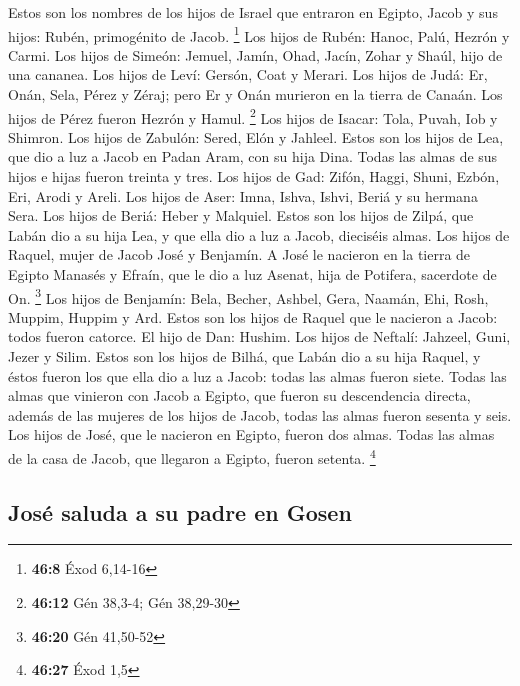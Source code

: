  Estos son los nombres de los hijos de Israel que entraron
en Egipto, Jacob y sus hijos: Rubén, primogénito de Jacob. \footnote{\textbf{46:8}
  Éxod 6,14-16}  Los hijos de Rubén: Hanoc, Palú, Hezrón y
Carmi.  Los hijos de Simeón: Jemuel, Jamín, Ohad, Jacín,
Zohar y Shaúl, hijo de una cananea.  Los hijos de Leví:
Gersón, Coat y Merari.  Los hijos de Judá: Er, Onán,
Sela, Pérez y Zéraj; pero Er y Onán murieron en la tierra de Canaán. Los
hijos de Pérez fueron Hezrón y Hamul. \footnote{\textbf{46:12} Gén
  38,3-4; Gén 38,29-30}  Los hijos de Isacar: Tola,
Puvah, Iob y Shimron.  Los hijos de Zabulón: Sered, Elón
y Jahleel.  Estos son los hijos de Lea, que dio a luz a
Jacob en Padan Aram, con su hija Dina. Todas las almas de sus hijos e
hijas fueron treinta y tres.  Los hijos de Gad: Zifón,
Haggi, Shuni, Ezbón, Eri, Arodi y Areli.  Los hijos de
Aser: Imna, Ishva, Ishvi, Beriá y su hermana Sera. Los hijos de Beriá:
Heber y Malquiel.  Estos son los hijos de Zilpá, que
Labán dio a su hija Lea, y que ella dio a luz a Jacob, dieciséis almas.
 Los hijos de Raquel, mujer de Jacob José y Benjamín.
 A José le nacieron en la tierra de Egipto Manasés y
Efraín, que le dio a luz Asenat, hija de Potifera, sacerdote de On.
\footnote{\textbf{46:20} Gén 41,50-52}  Los hijos de
Benjamín: Bela, Becher, Ashbel, Gera, Naamán, Ehi, Rosh, Muppim, Huppim
y Ard.  Estos son los hijos de Raquel que le nacieron a
Jacob: todos fueron catorce.  El hijo de Dan: Hushim.
 Los hijos de Neftalí: Jahzeel, Guni, Jezer y Silim.
 Estos son los hijos de Bilhá, que Labán dio a su hija
Raquel, y éstos fueron los que ella dio a luz a Jacob: todas las almas
fueron siete.  Todas las almas que vinieron con Jacob a
Egipto, que fueron su descendencia directa, además de las mujeres de los
hijos de Jacob, todas las almas fueron sesenta y seis. 
Los hijos de José, que le nacieron en Egipto, fueron dos almas. Todas
las almas de la casa de Jacob, que llegaron a Egipto, fueron setenta.
\footnote{\textbf{46:27} Éxod 1,5}

\hypertarget{josuxe9-saluda-a-su-padre-en-gosen}{%
\subsection{José saluda a su padre en
Gosen}\label{josuxe9-saluda-a-su-padre-en-gosen}}

